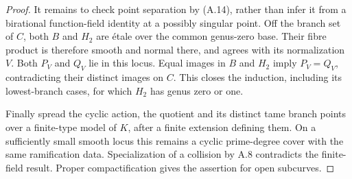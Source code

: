 \begin{proof}
It remains to check point separation by (A.14), rather
than infer it from a birational function-field identity
at a possibly singular point. Off the branch set of $C$,
both $B$ and $H_2$ are \'etale over the common genus-zero
base. Their fibre product is therefore smooth and normal
there, and agrees with its normalization $V$. Both
$P_V$ and $Q_V$ lie in this locus. Equal images in $B$ and
$H_2$ imply $P_V=Q_V$, contradicting their distinct images
on $C$. This closes the induction, including its
lowest-branch cases, for which $H_2$ has genus zero or one.

Finally spread the cyclic action, the quotient and its
distinct tame branch points over a finite-type model of
$K$, after a finite extension defining them. On a
sufficiently small smooth locus this remains a cyclic
prime-degree cover with the same ramification data.
Specialization of a collision by A.8 contradicts the
finite-field result. Proper compactification gives the
assertion for open subcurves.
\end{proof}

